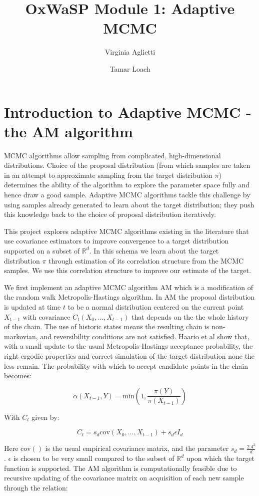 \documentclass{article}
\title{OxWaSP Module 1: Adaptive MCMC}
\author{Virginia Aglietti \and Tamar Loach}
\begin{document}
\maketitle

\section{Introduction to Adaptive MCMC - the AM algorithm}

MCMC algorithms allow sampling from complicated, high-dimensional distributions. Choice of the proposal distribution (from which samples are taken in an attempt to approximate sampling from the target distribution $\pi$) determines the ability of the algorithm to explore the parameter space fully and hence draw a good sample. Adaptive MCMC algorithms tackle this challenge by using samples already generated to learn about the target distribution; they push this knowledge back to the choice of proposal distribution iteratively.

This project explores adaptive MCMC algorithms existing in the literature that use covariance estimators to improve convergence to a target distribution supported on a subset of $\mathbb{R}^d$. In this schema we learn about the target distribution $\pi$ through estimation of its correlation structure from the MCMC samples. We use this correlation structure to improve our estimate of the target.

We first implement an adaptive MCMC algorithm AM \citep{haario2001} which is a modification of the random walk Metropolis-Hastings algorithm. In AM the proposal distribution is updated at time $t$ to be a normal distribution centered on the current point $X_{t-1}$ with covariance $C_t(X_0, ..., X_{t-1})$ that depends on the the whole history of the chain. The use of historic states means the resulting chain is non-markovian, and reversibility conditions are not satisfied. Haario et al show that, with a small update to the usual Metropolis-Hastings acceptance probability, the right ergodic properties and correct simulation of the target distribution none the less remain. The probability with which to accept candidate points in the chain becomes:

$$
\alpha(X_{t-1},Y) = \text{min}\left( 1,\frac{\pi(Y)}{\pi(X_{t-1})}\right)
$$

With $C_t$ given by:

$$
C_t = s_d \text{cov}(X_0, ..., X_{t-1}) + s_d\epsilon I_d
$$

Here $\text{cov}()$ is the usual empirical covariance matrix, and the parameter $s_d = \frac{2.4^2}{d}$ \citep{gelman1996}. $\epsilon$ is chosen to be very small compared to the subset of $\mathbb{R}^d$ upon which the target function is supported. The AM algorithm is computationally feasible %
due to recursive updating of the covariance matrix on acquisition of each new sample through the relation:
\end{document}

